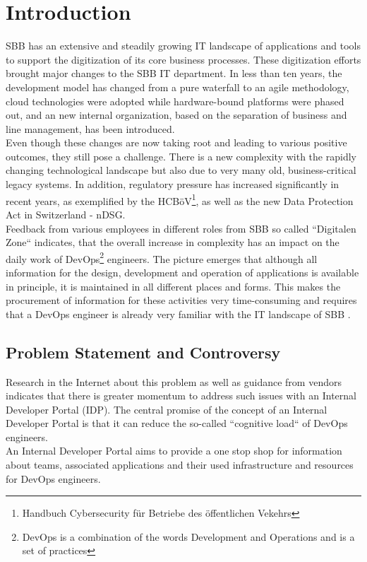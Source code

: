\documentclass[a4paper,12pt]{article}
\begin{document}
    \section{Introduction}
    \label{sec:introduction}
    SBB has an extensive and steadily growing IT landscape of applications and tools to support the digitization of its
    core business processes.
    These digitization efforts brought major changes to the SBB IT department.
    In less than ten years, the development model has changed from a pure waterfall to an agile methodology,
    cloud technologies were adopted while hardware-bound platforms were phased out, and an new internal organization,
    based on the separation of business and line management, has been introduced.\\
    Even though these changes are now taking root and leading to various positive outcomes, they still pose a challenge.
    There is a new complexity with the rapidly changing technological landscape but also due to very many old,
    business-critical legacy systems.
    In addition, regulatory pressure has increased significantly in recent years, as exemplified by the
    HCBöV\footnote{Handbuch Cybersecurity für Betriebe des öffentlichen Vekehrs}, as well as the new Data Protection Act in Switzerland - nDSG.\\
    Feedback from various employees in different roles from SBB so called ``Digitalen Zone`` indicates, that the overall
    increase in complexity has an impact on the daily work of DevOps\footnote{DevOps is a combination of the words
    Development and Operations and is a set of practices} engineers.
    The picture emerges that although all information for the design, development and operation of
    applications is available in principle, it is maintained in all different places and forms.
    This makes the procurement of information for these activities very time-consuming and requires that a DevOps
    engineer is already very familiar with the IT landscape of SBB .

    \subsection{Problem Statement and Controversy}
    \label{subsec:iproblemstatement}
    Research in the Internet about this problem as well as guidance from vendors indicates that there is greater momentum
    to address such issues with an Internal Developer Portal (IDP).
    The central promise of the concept of an Internal Developer Portal is that it can reduce the so-called
    ``cognitive load`` of DevOps engineers.\\
    An Internal Developer Portal aims to provide a one stop shop for information about teams, associated applications and
    their used infrastructure and resources for DevOps engineers.
\end{document}
